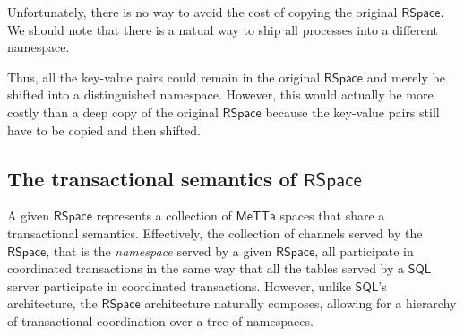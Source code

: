 Unfortunately, there is no way to avoid the cost of copying the
original $\mathsf{RSpace}$. We should note that there is a natual way
to ship all processes into a different namespace.


Thus, all the key-value pairs could remain in the original
$\mathsf{RSpace}$ and merely be shifted into a distinguished
namespace. However, this would actually be more costly than a deep
copy of the original $\mathsf{RSpace}$ because the key-value pairs
still have to be copied and then shifted.

\subsection{The transactional semantics of $\mathsf{RSpace}$}

A given $\mathsf{RSpace}$ represents a collection of $\mathsf{MeTTa}$
spaces that share a transactional semantics. Effectively, the
collection of channels served by the $\mathsf{RSpace}$, that is the
\emph{namespace} served by a given $\mathsf{RSpace}$, all participate
in coordinated transactions in the same way that all the tables served
by a $\mathsf{SQL}$ server participate in coordinated
transactions. However, unlike $\mathsf{SQL}$'s architecture, the
$\mathsf{RSpace}$ architecture naturally composes, allowing for a
hierarchy of transactional coordination over a tree of namespaces.
